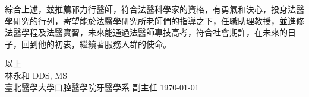 \documentclass{letter}
\begin{document}
\begin{letter}

綜合上述，玆推薦祁力行醫師，符合法醫科學家的資格，有勇氣和決心，投身法醫學研究的行列，寄望能於法醫學研究所老師們的指導之下，任職助理教授，並進修法醫學程及法醫實習，未來能通過法醫師專技高考，符合社會期許，在未來的日子，回到他的初衷，繼續著服務人群的使命。

\medskip
以上\\
林永和 DDS, MS\hspace{3mm}\\
臺北醫學大學口腔醫學院牙醫學系 副主任 \hspace{5mm} \today


\clearpage

%


\end{letter}
\end{document}
